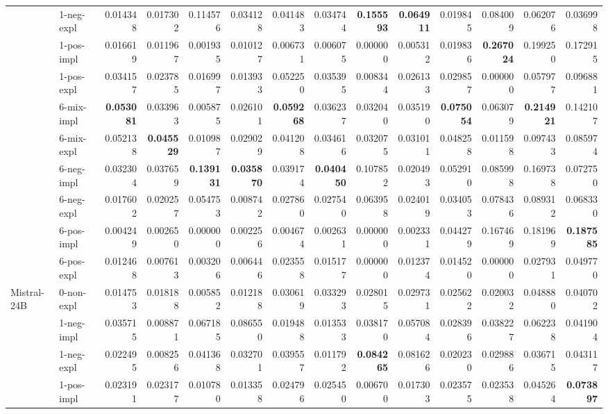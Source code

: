 \begin{tabular}{ll|rrrr|rrrr|rrrr}
 & 1-neg-expl & 0.014348 & 0.017302 & 0.114576 & 0.034128 & 0.041483 & 0.034744 & \bfseries 0.155593 & \bfseries 0.064911 & 0.019845 & 0.084009 & 0.062076 & 0.036998 \\
 & 1-pos-impl & 0.016619 & 0.011967 & 0.001935 & 0.010127 & 0.006731 & 0.006075 & 0.000000 & 0.005312 & 0.019836 & \bfseries 0.267024 & 0.199250 & 0.172915 \\
 & 1-pos-expl & 0.034157 & 0.023785 & 0.016997 & 0.013933 & 0.052250 & 0.035395 & 0.008344 & 0.026133 & 0.029857 & 0.000000 & 0.057977 & 0.096881 \\
 & 6-mix-impl & \bfseries 0.053081 & 0.033963 & 0.005875 & 0.026101 & \bfseries 0.059268 & 0.036237 & 0.032040 & 0.035190 & \bfseries 0.075054 & 0.063079 & \bfseries 0.214921 & 0.142107 \\
 & 6-mix-expl & 0.052138 & \bfseries 0.045529 & 0.010987 & 0.029029 & 0.041208 & 0.034616 & 0.032075 & 0.031011 & 0.048258 & 0.011598 & 0.097433 & 0.085974 \\
 & 6-neg-impl & 0.032304 & 0.037659 & \bfseries 0.139131 & \bfseries 0.035870 & 0.039174 & \bfseries 0.040450 & 0.107852 & 0.020493 & 0.052910 & 0.085998 & 0.169738 & 0.072750 \\
 & 6-neg-expl & 0.017602 & 0.020257 & 0.054753 & 0.008742 & 0.027860 & 0.027540 & 0.063958 & 0.024019 & 0.034053 & 0.078436 & 0.089312 & 0.068330 \\
 & 6-pos-impl & 0.004249 & 0.002650 & 0.000000 & 0.002256 & 0.004674 & 0.002631 & 0.000000 & 0.002331 & 0.044279 & 0.167469 & 0.181969 & \bfseries 0.187585 \\
 & 6-pos-expl & 0.012468 & 0.007613 & 0.003206 & 0.006446 & 0.023558 & 0.015177 & 0.000000 & 0.012374 & 0.014520 & 0.000000 & 0.027931 & 0.049770 \\
 \midrule
\multirow[c]{11}{*}{Mistral-24B} & 0-non-expl & 0.014753 & 0.018188 & 0.005852 & 0.012188 & 0.030619 & 0.033293 & 0.028015 & 0.029731 & 0.025622 & 0.020032 & 0.048880 & 0.040702 \\
 & 1-neg-impl & 0.035715 & 0.008871 & 0.067185 & 0.086550 & 0.019488 & 0.013533 & 0.038170 & 0.057084 & 0.028396 & 0.038227 & 0.062238 & 0.041904 \\
 & 1-neg-expl & 0.022495 & 0.008256 & 0.041368 & 0.032701 & 0.039557 & 0.011792 & \bfseries 0.084265 & 0.081626 & 0.020230 & 0.029886 & 0.036715 & 0.043117 \\
 & 1-pos-impl & 0.023191 & 0.023177 & 0.010780 & 0.013358 & 0.024796 & 0.025450 & 0.006700 & 0.017303 & 0.023575 & 0.023538 & 0.045264 & \bfseries 0.073897 \\

\end{tabular}
